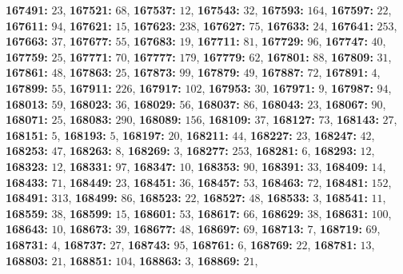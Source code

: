 \textsf{\bfseries 167491:} $23$, \textsf{\bfseries 167521:} $68$, \textsf{\bfseries 167537:} $12$, \textsf{\bfseries 167543:} $32$, \textsf{\bfseries 167593:} $164$, \textsf{\bfseries 167597:} $22$, \textsf{\bfseries 167611:} $94$, \textsf{\bfseries 167621:} $15$, \textsf{\bfseries 167623:} $238$, \textsf{\bfseries 167627:} $75$, \textsf{\bfseries 167633:} $24$, \textsf{\bfseries 167641:} $253$, \textsf{\bfseries 167663:} $37$, \textsf{\bfseries 167677:} $55$, \textsf{\bfseries 167683:} $19$, \textsf{\bfseries 167711:} $81$, \textsf{\bfseries 167729:} $96$, \textsf{\bfseries 167747:} $40$, \textsf{\bfseries 167759:} $25$, \textsf{\bfseries 167771:} $70$, \textsf{\bfseries 167777:} $179$, \textsf{\bfseries 167779:} $62$, \textsf{\bfseries 167801:} $88$, \textsf{\bfseries 167809:} $31$, \textsf{\bfseries 167861:} $48$, \textsf{\bfseries 167863:} $25$, \textsf{\bfseries 167873:} $99$, \textsf{\bfseries 167879:} $49$, \textsf{\bfseries 167887:} $72$, \textsf{\bfseries 167891:} $4$, \textsf{\bfseries 167899:} $55$, \textsf{\bfseries 167911:} $226$, \textsf{\bfseries 167917:} $102$, \textsf{\bfseries 167953:} $30$, \textsf{\bfseries 167971:} $9$, \textsf{\bfseries 167987:} $94$, \textsf{\bfseries 168013:} $59$, \textsf{\bfseries 168023:} $36$, \textsf{\bfseries 168029:} $56$, \textsf{\bfseries 168037:} $86$, \textsf{\bfseries 168043:} $23$, \textsf{\bfseries 168067:} $90$, \textsf{\bfseries 168071:} $25$, \textsf{\bfseries 168083:} $290$, \textsf{\bfseries 168089:} $156$, \textsf{\bfseries 168109:} $37$, \textsf{\bfseries 168127:} $73$, \textsf{\bfseries 168143:} $27$, \textsf{\bfseries 168151:} $5$, \textsf{\bfseries 168193:} $5$, \textsf{\bfseries 168197:} $20$, \textsf{\bfseries 168211:} $44$, \textsf{\bfseries 168227:} $23$, \textsf{\bfseries 168247:} $42$, \textsf{\bfseries 168253:} $47$, \textsf{\bfseries 168263:} $8$, \textsf{\bfseries 168269:} $3$, \textsf{\bfseries 168277:} $253$, \textsf{\bfseries 168281:} $6$, \textsf{\bfseries 168293:} $12$, \textsf{\bfseries 168323:} $12$, \textsf{\bfseries 168331:} $97$, \textsf{\bfseries 168347:} $10$, \textsf{\bfseries 168353:} $90$, \textsf{\bfseries 168391:} $33$, \textsf{\bfseries 168409:} $14$, \textsf{\bfseries 168433:} $71$, \textsf{\bfseries 168449:} $23$, \textsf{\bfseries 168451:} $36$, \textsf{\bfseries 168457:} $53$, \textsf{\bfseries 168463:} $72$, \textsf{\bfseries 168481:} $152$, \textsf{\bfseries 168491:} $313$, \textsf{\bfseries 168499:} $86$, \textsf{\bfseries 168523:} $22$, \textsf{\bfseries 168527:} $48$, \textsf{\bfseries 168533:} $3$, \textsf{\bfseries 168541:} $11$, \textsf{\bfseries 168559:} $38$, \textsf{\bfseries 168599:} $15$, \textsf{\bfseries 168601:} $53$, \textsf{\bfseries 168617:} $66$, \textsf{\bfseries 168629:} $38$, \textsf{\bfseries 168631:} $100$, \textsf{\bfseries 168643:} $10$, \textsf{\bfseries 168673:} $39$, \textsf{\bfseries 168677:} $48$, \textsf{\bfseries 168697:} $69$, \textsf{\bfseries 168713:} $7$, \textsf{\bfseries 168719:} $69$, \textsf{\bfseries 168731:} $4$, \textsf{\bfseries 168737:} $27$, \textsf{\bfseries 168743:} $95$, \textsf{\bfseries 168761:} $6$, \textsf{\bfseries 168769:} $22$, \textsf{\bfseries 168781:} $13$, \textsf{\bfseries 168803:} $21$, \textsf{\bfseries 168851:} $104$, \textsf{\bfseries 168863:} $3$, \textsf{\bfseries 168869:} $21$, 
